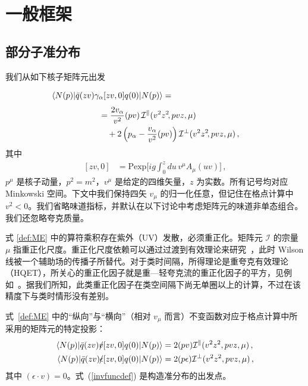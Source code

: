 \section{一般框架}\label{sect_formalism}%
%

%
\subsection{部分子准分布}\label{subsect_definitions}%
%
我们从如下核子矩阵元出发
\begin{align}
\label{def:ME}
 &\langle N(p)| \bar q (zv) \gamma_\alpha[zv,0] q(0) |N(p)\rangle  =
\phantom{\frac{2v_\alpha}{v^2} (pv) \mathcal{I}^\parallel (v^2z^2\!,pvz,\mu)}
\notag\\
&\hspace*{2.0cm} = \frac{2v_\alpha}{v^2} (pv)\, \mathcal{I}^\parallel (v^2z^2\!,pvz,\mu)
\notag\\
&\hspace*{2.0cm}\quad+ 2\left(p_\alpha- \frac{v_\alpha}{v^2} (pv) \right) \mathcal{I}^\perp (v^2z^2\!,pvz,\mu)\,,
\end{align}
其中
\begin{align}
\label{def:Wilson}
 [zv, 0] &= \text{Pexp}\Big[i g \int_0^z du\,  v^\mu A_\mu(uv)\Big]\,,
\end{align}
$p^\mu$ 是核子动量，$p^2 = m^2$，$v^\mu$ 是给定的四维矢量，$z$ 为实数。所有记号均对应 Minkowski 空间。下文中我们保持四矢 $v_\mu$ 的归一化任意，但记住在格点计算中 $v^2 <0$。我们省略味道指标，并默认在以下讨论中考虑矩阵元的味道非单态组合。我们还忽略夸克质量。

式 \eqref{def:ME} 中的算符乘积存在紫外（UV）发散，必须重正化。矩阵元 $\mathcal{I}$ 的宗量 $\mu$ 指重正化尺度。重正化尺度依赖可以通过过渡到有效理论来研究~\cite{Craigie:1980qs,Dorn:1986dt,Ji:2017oey}，此时 Wilson 线被一个辅助场的传播子所替代。对于类时间隔，所得理论是重夸克有效理论（HQET），所关心的重正化因子就是重—轻夸克流的重正化因子的平方，见例如~\cite{Chetyrkin:2003vi}。据我们所知，此类重正化因子在类空间隔下尚无单圈以上的计算，不过在该精度下与类时情形没有差别。


式~\eqref{def:ME} 中的``纵向''与``横向''（相对 $v_\mu$ 而言）不变函数对应于格点计算中所采用的矩阵元的特定投影：
\begin{align}\label{invfuncdef}
 \langle N(p)| \bar q (zv) \slashed{v} [zv,0]q(0) |N(p)\rangle  & = 2 (pv) \mathcal{I}^\parallel (v^2z^2,pvz,\mu)\,,
\notag\\
  \langle N(p)| \bar q (zv) \slashed{\epsilon}[zv,0] q(0) |N(p)\rangle &= 2 (p\epsilon) \mathcal{I}^\perp (v^2z^2,pvz,\mu)\,,
\end{align}
其中 $(\epsilon\cdot v) =0$。式~(\ref{invfuncdef}) 是构造准分布的出发点。

